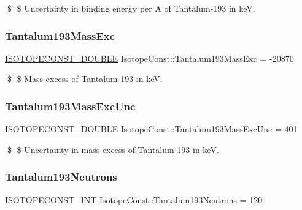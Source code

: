 \$ \$ Uncertainty in binding energy per A of Tantalum-\/193 in keV. \mbox{\label{group___isotope_const-_tantalum-_ta193_ga14d03683e1adb476217ac7c330fbb08c}} 
\subsubsection{\texorpdfstring{Tantalum193\+Mass\+Exc}{Tantalum193MassExc}}
{\footnotesize\ttfamily \mbox{\hyperlink{group___isotope_const-_macros_ga8f45a7272ce02c0b4c65c44636ed719a}{I\+S\+O\+T\+O\+P\+E\+C\+O\+N\+S\+T\+\_\+\+D\+O\+U\+B\+LE}} Isotope\+Const\+::\+Tantalum193\+Mass\+Exc = -\/20870}

\$ \$ Mass excess of Tantalum-\/193 in keV. \mbox{\label{group___isotope_const-_tantalum-_ta193_gaaf7c0c4560ad1770c2ac8770f8c6031c}} 
\subsubsection{\texorpdfstring{Tantalum193\+Mass\+Exc\+Unc}{Tantalum193MassExcUnc}}
{\footnotesize\ttfamily \mbox{\hyperlink{group___isotope_const-_macros_ga8f45a7272ce02c0b4c65c44636ed719a}{I\+S\+O\+T\+O\+P\+E\+C\+O\+N\+S\+T\+\_\+\+D\+O\+U\+B\+LE}} Isotope\+Const\+::\+Tantalum193\+Mass\+Exc\+Unc = 401}

\$ \$ Uncertainty in mass excess of Tantalum-\/193 in keV. \mbox{\label{group___isotope_const-_tantalum-_ta193_ga6907e37eb745cb922c09127ca017d171}} 
\subsubsection{\texorpdfstring{Tantalum193\+Neutrons}{Tantalum193Neutrons}}
{\footnotesize\ttfamily \mbox{\hyperlink{group___isotope_const-_macros_ga5f18360b3e99483a35c32d789e62621c}{I\+S\+O\+T\+O\+P\+E\+C\+O\+N\+S\+T\+\_\+\+I\+NT}} Isotope\+Const\+::\+Tantalum193\+Neutrons = 120}

